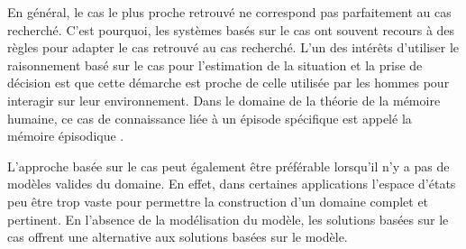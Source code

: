 \documentclass[a4paper,11pt,twoside]{StyleThese}
\begin{document}
En général, le cas le plus proche retrouvé ne correspond pas parfaitement au cas recherché. C'est pourquoi, les systèmes basés sur le cas ont souvent recours à des règles pour adapter le cas retrouvé au cas recherché.
L'un des intérêts d'utiliser le raisonnement basé sur le cas pour l'estimation de la situation et la prise de décision est que cette démarche est proche de celle utilisée par les hommes pour interagir sur leur environnement. Dans le domaine de la théorie de la mémoire humaine, ce cas de connaissance liée à un épisode spécifique est appelé la mémoire épisodique \cite{tulving1972episodic}.

L'approche basée sur le cas peut également être préférable lorsqu'il n'y a pas de modèles valides du domaine. En effet, dans certaines applications l'espace d'états peu être trop vaste pour permettre la construction d'un domaine complet et pertinent. En l'absence de la modélisation du modèle, les solutions basées sur le cas offrent une alternative aux solutions basées sur le modèle.





\end{document}
